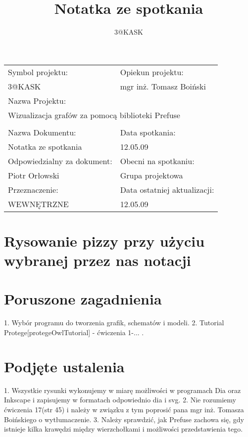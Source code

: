 \documentclass[a4paper,10pt]{article}
\title{Notatka ze spotkania}
\author{3@KASK}
\begin{document}



\maketitle


\begin{center}
\begin{tabular}{|p{7cm}|p{7cm}|}
\hline
Symbol projektu: & Opiekun projektu:   \tabularnewline 
3@KASK & mgr inż. Tomasz Boiński    \tabularnewline \hline
\multicolumn{2}{|l|}{Nazwa Projektu: } \tabularnewline
\multicolumn{2}{|l|}{Wizualizacja grafów za pomocą biblioteki Prefuse } \tabularnewline 
\hline
\multicolumn{2}{l}{ } \tabularnewline %
\hline 
Nazwa Dokumentu: & Data spotkania:   \tabularnewline 
Notatka ze spotkania & 12.05.09 \tabularnewline \hline
Odpowiedzialny za dokument: & Obecni na spotkaniu:   \tabularnewline 
Piotr Orłowski & Grupa projektowa \tabularnewline \hline
Przeznaczenie: & Data ostatniej aktualizacji:   \tabularnewline 
WEWNĘTRZNE & 12.05.09 \tabularnewline \hline
\end{tabular}
\end{center}



\section{Rysowanie pizzy przy użyciu wybranej przez nas notacji}


\section{Poruszone zagadnienia}
1. Wybór programu do tworzenia grafik, schematów i modeli.
2. Tutorial Protege[protegeOwlTutorial] - ćwiczenia 1-... .

\section{Podjęte ustalenia}
1. Wszystkie rysunki wykonujemy w miarę możliwości w programach Dia oraz Inkscape i zapisujemy w formatach odpowiednio dia i svg.
2. Nie rozumiemy ćwiczenia 17(str 45) i należy w związku z tym poprosić pana mgr inż. Tomasza Boińskiego o wytłumaczenie.
3. Należy sprawdzić, jak Prefuse zachowa się, gdy istnieje kilka krawędzi między wierzchołkami i możliwości przedstawienia tego.
\newpage
\tableofcontents
\newpage


\clearpage
{}
{}

\end{document}

